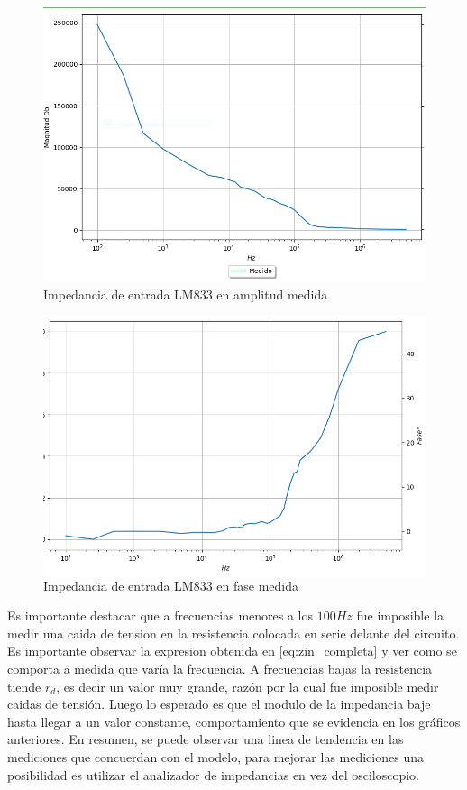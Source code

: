 \begin{figure}[H]	
	\centering
	\includegraphics[width=\textwidth]{Ejercicio2/Imagenes/Zin_A_LM833_Medido.png}
	\caption{Impedancia de entrada LM833 en amplitud medida}
\end{figure}

\begin{figure}[H]	
	\centering
	\includegraphics[width=\textwidth]{Ejercicio2/Imagenes/Zin_F_LM833_Medido.png}
	\caption{Impedancia de entrada LM833 en fase medida}
\end{figure}

Es importante destacar que a frecuencias menores a los $100 Hz$ fue imposible la medir una caida de tension en la resistencia colocada en serie delante del circuito. Es importante observar la expresion obtenida en \ref{eq:zin_completa} y ver como se comporta a medida que varía la frecuencia. A frecuencias bajas la resistencia tiende $r_d$, es decir un valor muy grande, razón por la cual fue imposible medir caidas de tensión. Luego lo esperado es que el modulo de la impedancia baje hasta llegar a un valor constante, comportamiento que se evidencia en los gráficos anteriores. En resumen, se puede observar una linea de tendencia en las mediciones que concuerdan con el modelo, para mejorar las mediciones una posibilidad es utilizar el analizador de impedancias en vez del osciloscopio.


